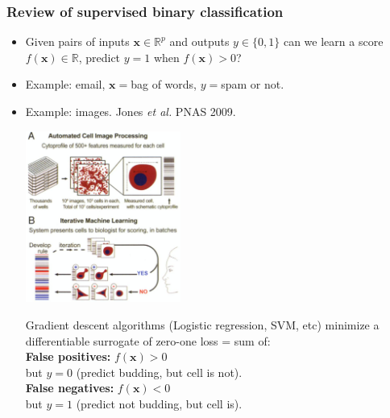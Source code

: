 \documentclass[t]{beamer}
\begin{document}
\begin{frame}
  \frametitle{Review of supervised binary classification}
  
  \begin{itemize}
  \item Given pairs of inputs $\mathbf x\in\mathbb R^p$ and outputs
    $y\in\{0,1\}$ can we learn a score 
    $f(\mathbf x)\in\mathbb R$, predict $y=1$ when $f(\mathbf x)>0$?
  \item Example: email, $\mathbf x =$bag of words, $y=$spam or not.
  \item Example: images. Jones {\it et al.} PNAS 2009.
    \parbox{2in}{\includegraphics[width=2in]{cellprofiler}}
    \parbox{1.9in}{Gradient descent algorithms (Logistic regression, SVM, etc) minimize a differentiable surrogate of zero-one loss = sum of:\\
      \textbf{False positives:} $f(\mathbf x)>0$\\but $y=0$ (predict
      budding, but cell is not).\\
      \textbf{False negatives:} $f(\mathbf x)<0$\\but $y=1$ (predict
      not budding, but cell is).  }
  \end{itemize} 
\end{frame}
\end{document}
